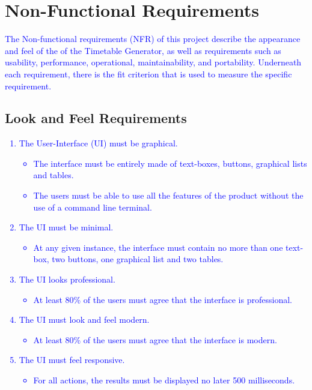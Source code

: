 \documentclass[12pt]{article}
\begin{document}
\newpage
\section{Non-Functional Requirements}
\textcolor{blue}{
\tab The Non-functional requirements (NFR) of this project describe the appearance and feel of the of the Timetable Generator, as well as requirements such as usability, performance, operational, maintainability, and portability. Underneath each requirement, there is the fit criterion that is used to measure the specific requirement.
}
\subsection{Look and Feel Requirements}
\textcolor{blue}{
\begin{enumerate}
    \item The User-Interface (UI) must be graphical.
    \begin{itemize}
        \item The interface must be entirely made of text-boxes, buttons, graphical lists and tables.
        \item The users must be able to use all the features of the product without the use of a command line terminal.
    \end{itemize}
    \item The UI must be minimal.
    \begin{itemize}
        \item At any given instance, the interface must contain no more than one text-box, two buttons, one graphical list and two tables.
    \end{itemize}
    \item The UI looks professional.
    \begin{itemize}
        \item At least 80\% of the users must agree that the interface is professional.
    \end{itemize}
    \item The UI must look and feel modern.
    \begin{itemize}
        \item At least 80\% of the users must agree that the interface is modern.
    \end{itemize}
    \item The UI must feel responsive.
    \begin{itemize}
        \item For all actions, the results must be displayed no later 500 milliseconds.
    \end{itemize}
\end{enumerate}
}
\end{document}
